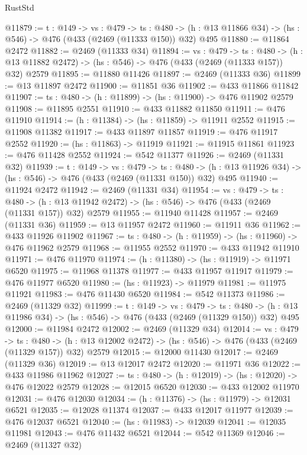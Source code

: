 \begin{lexlean}{RustStd}
\begin{coremodule}
@11879 := {t : @149} ->
  {vs : @479} ->
  {ts : @480} -> (h : @13 @11866 @34) -> (hs : @546) -> @476 (@433 (@2469 (@11333 @150)) @32) @495
@11880 := @11864 @2472
@11882 := @2469 (@11333 @34)
@11894 := {vs : @479} ->
  {ts : @480} ->
  (h : @13 @11882 @2472) -> (hs : @546) -> @476 (@433 (@2469 (@11333 @157)) @32) @2579
@11895 := @11880 @11426
@11897 := @2469 (@11333 @36)
@11899 := @13 @11897 @2472
@11900 := @11851 @36
@11902 := @433 @11866 @11842
@11907 := {ts : @480} -> (h : @11899) -> (hs : @11900) -> @476 @11902 @2579
@11908 := @11895 @2551
@11910 := @433 @11882 @11850
@11911 := @476 @11910
@11914 := (h : @11384) -> (hs : @11859) -> @11911 @2552
@11915 := @11908 @11382
@11917 := @433 @11897 @11857
@11919 := @476 @11917 @2552
@11920 := (hs : @11863) -> @11919
@11921 := @11915 @11861
@11923 := @476 @11428 @2552
@11924 := @542 @11377
@11926 := @2469 (@11331 @32)
@11939 := {t : @149} ->
  {vs : @479} ->
  {ts : @480} -> (h : @13 @11926 @34) -> (hs : @546) -> @476 (@433 (@2469 (@11331 @150)) @32) @495
@11940 := @11924 @2472
@11942 := @2469 (@11331 @34)
@11954 := {vs : @479} ->
  {ts : @480} ->
  (h : @13 @11942 @2472) -> (hs : @546) -> @476 (@433 (@2469 (@11331 @157)) @32) @2579
@11955 := @11940 @11428
@11957 := @2469 (@11331 @36)
@11959 := @13 @11957 @2472
@11960 := @11911 @36
@11962 := @433 @11926 @11902
@11967 := {ts : @480} -> (h : @11959) -> (hs : @11960) -> @476 @11962 @2579
@11968 := @11955 @2552
@11970 := @433 @11942 @11910
@11971 := @476 @11970
@11974 := (h : @11380) -> (hs : @11919) -> @11971 @6520
@11975 := @11968 @11378
@11977 := @433 @11957 @11917
@11979 := @476 @11977 @6520
@11980 := (hs : @11923) -> @11979
@11981 := @11975 @11921
@11983 := @476 @11430 @6520
@11984 := @542 @11373
@11986 := @2469 (@11329 @32)
@11999 := {t : @149} ->
  {vs : @479} ->
  {ts : @480} -> (h : @13 @11986 @34) -> (hs : @546) -> @476 (@433 (@2469 (@11329 @150)) @32) @495
@12000 := @11984 @2472
@12002 := @2469 (@11329 @34)
@12014 := {vs : @479} ->
  {ts : @480} ->
  (h : @13 @12002 @2472) -> (hs : @546) -> @476 (@433 (@2469 (@11329 @157)) @32) @2579
@12015 := @12000 @11430
@12017 := @2469 (@11329 @36)
@12019 := @13 @12017 @2472
@12020 := @11971 @36
@12022 := @433 @11986 @11962
@12027 := {ts : @480} -> (h : @12019) -> (hs : @12020) -> @476 @12022 @2579
@12028 := @12015 @6520
@12030 := @433 @12002 @11970
@12031 := @476 @12030
@12034 := (h : @11376) -> (hs : @11979) -> @12031 @6521
@12035 := @12028 @11374
@12037 := @433 @12017 @11977
@12039 := @476 @12037 @6521
@12040 := (hs : @11983) -> @12039
@12041 := @12035 @11981
@12043 := @476 @11432 @6521
@12044 := @542 @11369
@12046 := @2469 (@11327 @32)

\end{coremodule}
\end{lexlean}

